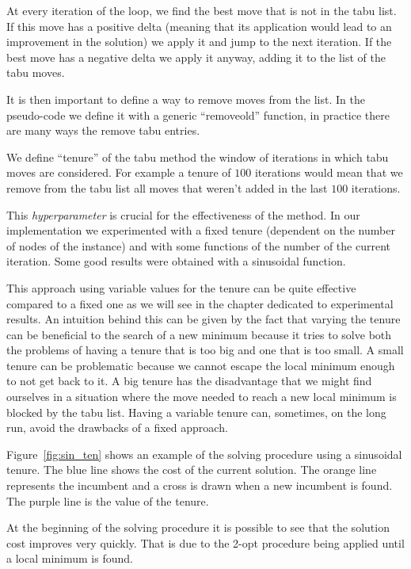 \documentclass{article}
\begin{document}
At every iteration of the loop, we find the best move that is not in the tabu list. If this move has a positive delta (meaning that its application would lead to an
improvement in the solution) we apply it and jump to the next iteration. If the best
move has a negative delta we apply it anyway, adding it to the list of the tabu moves.

It is then important to define a way to remove moves from the list. In the pseudo-code we define it with a generic ``removeold'' function, in practice there are many ways the remove tabu entries.

We define ``tenure'' of the tabu method the window of iterations in which tabu moves are considered. For example a tenure of $100$ iterations would mean that we remove
from the tabu list all moves that weren't added in the last $100$ iterations.

This \textit{hyperparameter} is crucial for the effectiveness of the method. In our implementation we experimented with a fixed tenure (dependent on the number of
nodes of the instance) and with some functions of the number of the current iteration. Some good results were obtained with a sinusoidal function.

This approach using variable values for the tenure can be quite effective compared to a fixed one as we will see in the chapter dedicated to experimental results.
An intuition behind this can be given by the fact that varying the tenure can be beneficial to the search of a new minimum because it tries to solve both the problems of having a tenure that is too big and one that is too small.
A small tenure can be problematic because we cannot escape the local minimum enough to not get back to it. A big tenure has the disadvantage that we might find ourselves in a situation where the move needed to reach a new local minimum is blocked by the
tabu list. Having a variable tenure can, sometimes, on the long run, avoid the drawbacks of a fixed approach.

Figure~\ref{fig:sin_ten} shows an example of the solving procedure using
a sinusoidal tenure.
The blue line shows the cost of the current solution. The orange line represents
the incumbent and a cross is drawn when a new incumbent is found.
The purple line is the value of the tenure.

At the beginning of the solving procedure it is possible to see that the solution
cost improves very quickly. That is due to the 2-opt procedure being applied
until a local minimum is found.
\end{document}
